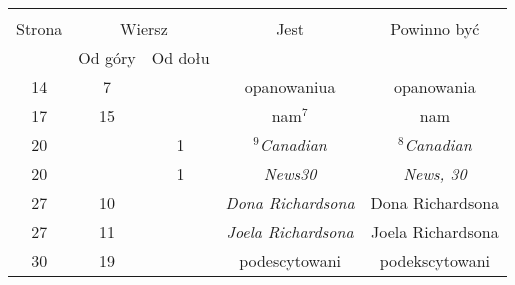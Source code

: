 \documentclass[a4paper,11pt]{article}
\begin{document}
\begin{center}

  \begin{tabular}{|c|c|c|c|c|}
    \hline
    & \multicolumn{2}{c|}{} & & \\
    Strona & \multicolumn{2}{c|}{Wiersz} & Jest
                              & Powinno być \\ \cline{2-3}
    & Od góry & Od dołu & & \\
    \hline
    14  &  7 & & opanowaniua & opanowania \\
    17  & 15 & & nam$^{ 7 }$ & nam \\
    20  & &  1 & $^{ 9 }$\textit{Canadian} & $^{ 8 }$\textit{Canadian} \\
    20  & &  1 & \textit{News30} & \textit{News, 30} \\
    27  & 10 & & \textit{Dona Richardsona} & Dona Richardsona \\
    27  & 11 & & \textit{Joela Richardsona} & Joela Richardsona \\
    30  & 19 & & podescytowani & podekscytowani \\
    \hline
  \end{tabular}

\end{center}


\vspace{\spaceOne}












\end{document}
